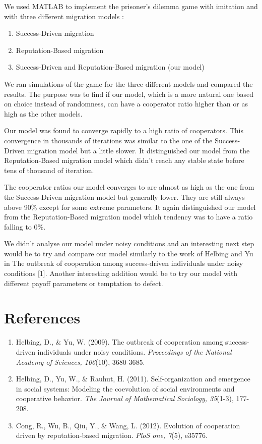 \documentclass[11pt]{article}
\begin{document}
We used MATLAB to implement the prisoner's dilemma game with imitation and with three different migration models :
\begin{enumerate}
	\item Success-Driven migration
	\item Reputation-Based migration
	\item Success-Driven and Reputation-Based migration (our model)
\end{enumerate}
We ran simulations of the game for the three different models and compared the results. The purpose was to find if our model, which is a more natural one based on choice instead of randomness, can have a cooperator ratio higher than or as high as the other models.

Our model was found to converge rapidly to a high ratio of cooperators. This convergence in thousands of iterations was similar to the one of the Success-Driven migration model but a little slower. It distinguished our model from the Reputation-Based migration model which didn't reach any stable state before tens of thousand of iteration.

The cooperator ratios our model converges to are almost as high as the one from the Success-Driven migration model but generally lower. They are still always above 90\% except for some extreme parameters. It again distinguished our model from the Reputation-Based migration model which tendency was to have a ratio falling to 0\%.

We didn't analyse our model under noisy conditions and an interesting next step would be to try and compare our model similarly to the work of Helbing and Yu in The outbreak of cooperation among success-driven individuals under noisy conditions [1]. Another interesting addition would be to try our model with different payoff parameters or temptation to defect.




\section{References}

\begin{enumerate}
\item Helbing, D., \& Yu, W. (2009). The outbreak of cooperation among success-driven individuals under noisy conditions. \textit{Proceedings of the National Academy of Sciences, 106}(10), 3680-3685.
\item Helbing, D., Yu, W., \& Rauhut, H. (2011). Self-organization and emergence in social systems: Modeling the coevolution of social environments and cooperative behavior. \textit{The Journal of Mathematical Sociology, 35}(1-3), 177-208.
\item Cong, R., Wu, B., Qiu, Y., \& Wang, L. (2012). Evolution of cooperation driven by reputation-based migration. \textit{PloS one, 7}(5), e35776.
\end{enumerate}
\end{document}
